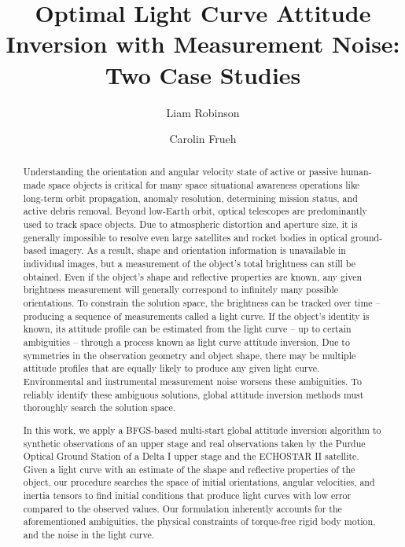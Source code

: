 \documentclass[a4paper,twocolumn]{spaceDebrisC} %
\title{Optimal Light Curve Attitude Inversion with Measurement Noise: Two Case Studies}
\author{Liam Robinson}
\author{Carolin Frueh}
\affil{Purdue University, West Lafayette, United States, Email: \texttt{\{robin502, cfrueh\}$@$purdue.edu}}
\begin{document}

\maketitle

\begin{abstract}

Understanding the orientation and angular velocity state of active or passive human-made space objects is critical for many space situational awareness operations like long-term orbit propagation, anomaly resolution, determining mission status, and active debris removal. Beyond low-Earth orbit, optical telescopes are predominantly used to track space objects. Due to atmospheric distortion and aperture size, it is generally impossible to resolve even large satellites and rocket bodies in optical ground-based imagery. As a result, shape and orientation information is unavailable in individual images, but a measurement of the object's total brightness can still be obtained. Even if the object's shape and reflective properties are known, any given brightness measurement will generally correspond to infinitely many possible orientations. To constrain the solution space, the brightness can be tracked over time -- producing a sequence of measurements called a light curve. If the object's identity is known, its attitude profile can be estimated from the light curve -- up to certain ambiguities -- through a process known as light curve attitude inversion. Due to symmetries in the observation geometry and object shape, there may be multiple attitude profiles that are equally likely to produce any given light curve. Environmental and instrumental measurement noise worsens these ambiguities. To reliably identify these ambiguous solutions, global attitude inversion methods must thoroughly search the solution space.

In this work, we apply a BFGS-based multi-start global attitude inversion algorithm to synthetic observations of an upper stage and real observations taken by the Purdue Optical Ground Station of a Delta I upper stage and the ECHOSTAR II satellite. Given a light curve with an estimate of the shape and reflective properties of the object, our procedure searches the space of initial orientations, angular velocities, and inertia tensors to find initial conditions that produce light curves with low error compared to the observed values. Our formulation inherently accounts for the aforementioned ambiguities, the physical constraints of torque-free rigid body motion, and the noise in the light curve.

\end{abstract}
\end{document}
